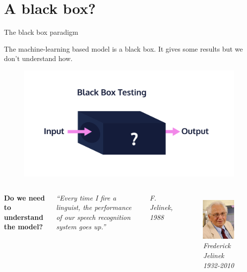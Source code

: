 \documentclass[handout, 10pt]{beamer}
\newcommand{\rref}[1][]{\hfill{\scriptsize\textit{#1}}}
\begin{document}
\section{A black box?}
\begin{frame}{The black box paradigm}

The machine-learning based model is a \alert{black box}. It gives some results but we don't understand how.
\begin{figure}
    \centering
    \includegraphics[width=.4\textwidth]{fig/blackBox.png}

\end{figure}

\begin{columns}
{\bf Do we need to understand the model?}

\pause
{\it``Every time I fire a linguist, the performance of our speech recognition system goes up.''}

\rref[F. Jelinek, 1988]
\begin{figure}
\includegraphics[width=.4\textwidth]{fig/jelinek.jpeg}\\
  {\small {\it Frederick Jelinek 1932-2010}}
\end{figure}
\end{columns}

\end{frame}
\end{document}

